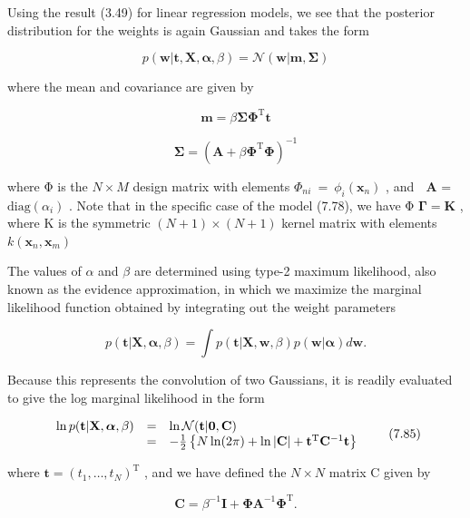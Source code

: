 \documentclass[
  10
]{article}
\begin{document}
Using the result (3.49) for linear regression models, we see that the
posterior distribution for the weights is again Gaussian and takes the
form

\[
p (\mathbf {w} | \mathbf {t}, \mathbf {X}, \boldsymbol {\alpha}, \beta) = \mathcal {N} (\mathbf {w} | \mathbf {m}, \boldsymbol {\Sigma})\tag{7.81}
\]

where the mean and covariance are given by

\[
\mathbf {m} = \beta \boldsymbol {\Sigma} \boldsymbol {\Phi} ^ {\mathrm{T}} \mathbf {t}\tag{7.82}
\]

\[
\boldsymbol {\Sigma} = \left(\mathbf {A} + \beta \boldsymbol {\Phi} ^ {\mathrm{T}} \boldsymbol {\Phi}\right) ^ {- 1}\tag{7.83}
\]

where Φ is the \(N \times M\) design matrix with elements
\(\Phi _ { n i } ~ = ~ \phi _ { i } ( \mathbf { x } _ { n } )\) , and
\({ \textbf { A } } =\) \(\mathrm { d i a g } ( \alpha _ { i } )\) .
Note that in the specific case of the model (7.78), we have Φ
\({ \mathbf { \Gamma } } = { \mathbf { K } }\) , where K is the
symmetric \(( N + 1 ) \times ( N + 1 )\) kernel matrix with elements
\(k ( \mathbf { x } _ { n } , \mathbf { x } _ { m } )\)

The values of \(\alpha\) and \(\beta\) are determined using type-2
maximum likelihood, also known as the evidence approximation, in which
we maximize the marginal likelihood function obtained by integrating out
the weight parameters

\[
p (\mathbf {t} | \mathbf {X}, \boldsymbol {\alpha}, \beta) = \int p (\mathbf {t} | \mathbf {X}, \mathbf {w}, \beta) p (\mathbf {w} | \boldsymbol {\alpha}) d \mathbf {w}.\tag{7.84}
\]

Because this represents the convolution of two Gaussians, it is readily
evaluated to give the log marginal likelihood in the form

\[
\begin{array}{r c l} \ln p (\mathbf {t} | \mathbf {X}, \boldsymbol {\alpha}, \beta) & = & \ln \mathcal {N} (\mathbf {t} | \mathbf {0}, \mathbf {C}) \\ & = & - \frac {1}{2} \left\{N \ln (2 \pi) + \ln | \mathbf {C} | + \mathbf {t} ^ {\mathrm{T}} \mathbf {C} ^ {- 1} \mathbf {t} \right\} \end{array}\tag{7.85}
\]

where
\({ \mathbf t } = ( t _ { 1 } , \ldots , t _ { N } ) ^ { \mathrm { T } }\)
, and we have defined the \(N \times N\) matrix C given by

\[
\mathbf {C} = \beta^ {- 1} \mathbf {I} + \boldsymbol {\Phi} \mathbf {A} ^ {- 1} \boldsymbol {\Phi} ^ {\mathrm{T}}.\tag{7.86}
\]
\end{document}
